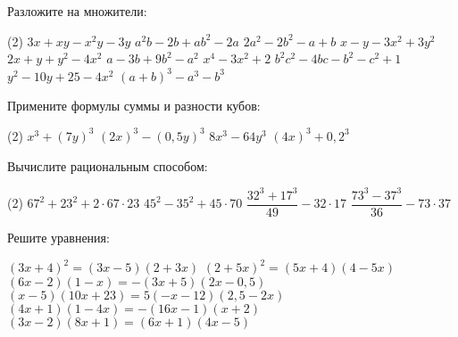 %
%

\begin{class}[number=1]
	\begin{listofex}
		\item Разложите на множители: %
		\begin{tasks}(2)
			\task \( 3x+xy-x^2y-3y \)
			\task \( a^2b-2b+ab^2-2a \)
			\task \( 2a^2-2b^2-a+b \)
			\task \( x-y-3x^2+3y^2 \)
			\task \( 2x+y+y^2-4x^2 \)
			\task \( a-3b+9b^2-a^2 \)
			\task \( x^4-3x^2+2 \)
			\task \( b^2c^2-4bc-b^2-c^2+1 \)
			\task \( y^2-10y+25-4x^2 \)
			\task \( (a+b)^3-a^3-b^3 \)
		\end{tasks}
		\item Примените формулы суммы и разности кубов:
		\begin{tasks}(2)
			\task \( x^3+(7y)^3 \)
			\task \( (2x)^3-(0,5y)^3 \)
			\task \( 8x^3-64y^3 \)
			\task \( (4x)^3+0,2^3 \)
		\end{tasks}
		\item Вычислите рациональным способом: %
		\begin{tasks}(2)
			\task \( 67^2+23^2+2\cdot67\cdot23 \)
			\task \( 45^2-35^2+45\cdot70 \)
			\task \( \dfrac{ 32^3+17^3 }{ 49 }-32\cdot17 \)
			\task \( \dfrac{ 73^3-37^3 }{ 36 }-73\cdot37 \)
		\end{tasks}
		\item Решите уравнения:
		\begin{tasks}
			\task \( (3x+4)^2=(3x-5)(2+3x) \)
			\task \( (2+5x)^2=(5x+4)(4-5x) \)
			\task \( (6x-2)(1-x)=-(3x+5)(2x-0,5) \)
			\task \( (x-5)(10x+23)=5(-x-12)(2,5-2x) \)
			\task \( (4x+1)(1-4x)=-(16x-1)(x+2) \)
			\task \( (3x-2)(8x+1)=(6x+1)(4x-5) \)
		\end{tasks}
	\end{listofex}
\end{class}

